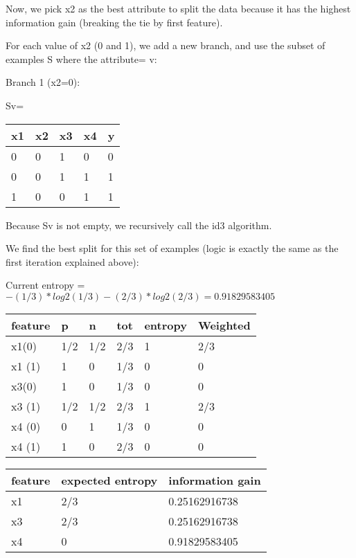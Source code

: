 \documentclass[12pt, fullpage,letterpaper]{article}
\begin{document}
\begin{enumerate}
\begin{enumerate}
Now, we pick x2 as the best attribute to split the data because it has the highest information gain (breaking the tie by first feature).

For each value of x2 (0 and 1), we add a new branch, and use the subset of examples S where the attribute= v:

Branch 1 (x2=0):

Sv=\begin{tabular}{|l|l|l|l|l|}
	\hline
	x1 & x2 & x3 & x4 & y \\ \hline
	0  & 0  & 1  & 0  & 0 \\ \hline
	0  & 0  & 1  & 1  & 1 \\ \hline
	1  & 0  & 0  & 1  & 1 \\ \hline
	\end{tabular}

Because Sv is not empty, we recursively call the id3 algorithm. 

We find the best split for this set of examples (logic is exactly the same as the first iteration explained above):

Current entropy = $-(1/3)*log2(1/3)-(2/3)*log2(2/3)=0.91829583405$

\begin{tabular}{|l|l|l|l|l|l|}
	\hline
	feature & p   & n   & tot & entropy & Weighted \\ \hline
	x1(0)   & 1/2 & 1/2 & 2/3 & 1       & 2/3      \\ \hline
	x1 (1)  & 1   & 0   & 1/3 & 0       & 0        \\ \hline
	x3(0)   & 1   & 0   & 1/3 & 0       & 0        \\ \hline
	x3 (1)  & 1/2 & 1/2 & 2/3 & 1       & 2/3      \\ \hline
	x4 (0)  & 0   & 1   & 1/3 & 0       & 0        \\ \hline
	x4 (1)  & 1   & 0   & 2/3 & 0       & 0        \\ \hline
	\end{tabular}


	\begin{tabular}{|l|l|l|}
		\hline
		feature & expected entropy & information gain \\ \hline
		x1      & 2/3              & 0.25162916738    \\ \hline
		x3      & 2/3              & 0.25162916738    \\ \hline
		x4      & 0                & 0.91829583405    \\ \hline
		\end{tabular}


\end{enumerate}
\end{enumerate}
\end{document}
